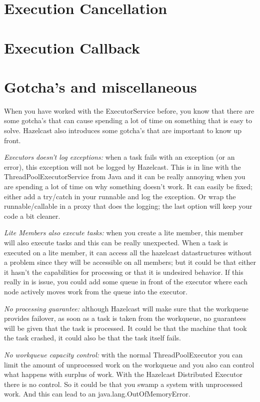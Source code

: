 \section{Execution Cancellation}

\section{Execution Callback}

\section{Gotcha's and miscellaneous}
When you have worked with the ExecutorService before, you know that there are some gotcha's that can cause spending a lot of time on something that is easy to solve. Hazelcast also introduces some gotcha's that are important to know up front.

\emph{Executors doesn't log exceptions:} when a task fails with an exception (or an error), this exception will not be logged by Hazelcast. This is in line with the ThreadPoolExecutorService from Java and it can be really annoying when you are spending a lot of time on why something doesn't work. It can easily be fixed; either add a try/catch in your runnable and log the exception. Or wrap the runnable/callable in a proxy that does the logging; the last option will keep your code a bit cleaner. 

\emph{Lite Members also execute tasks:} when you create a lite member, this member will also execute tasks and this can be really unexpected. When a task is executed on a lite member, it can access all the hazelcast datastructures without a problem since they will be accessible on all members; but it could be that either it hasn't the capabilities for processing or that it is undesired behavior. If this really in is issue, you could add some queue in front of the executor where each node actively moves work from the queue into the executor.

\emph{No processing guarantee:} although Hazelcast will make sure that the workqueue provides failover, as soon as a task is taken from the workqueue, no guarantees will be given that the task is processed. It could be that the machine that took the task crashed, it could also be that the task itself fails. 

\emph{No workqueue capacity control:} with the normal ThreadPoolExecutor you can limit the amount of unprocessed work on the workqueue and you also can control what happens with surplus of work. With the Hazelcast Distributed Executor there is no control. So it could be that you swamp a system with unprocessed work. And this can lead to an java.lang.OutOfMemoryError.


